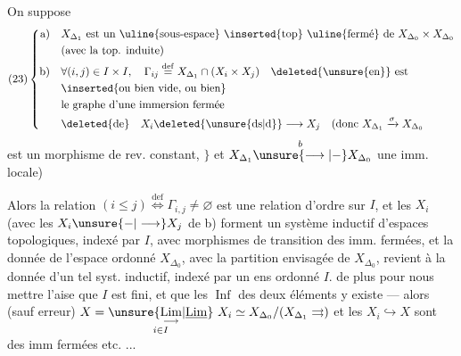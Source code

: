 On suppose
\[
(23)\left\{\begin{aligned}
\text{a)}\quad &X_{\Delta_1}\text{ est un \uline{sous-espace} \inserted{top} \uline{fermé} de }X_{\Delta_0}\times X_{\Delta_0}\\
&\text{(avec la top. induite)}\\
\text{b)}\quad &\forall(i,j)\in I\times I,\quad\Gamma_{ij}\overset{\mathrm{def}}{=}X_{\Delta_1}\cap(X_i\times X_j)\quad\text{\deleted{\unsure{en}} est}\\
&\text{\inserted{ou bien vide, ou bien}}\\
&\text{le graphe d'une immersion fermée}\\
&\deleted{\text{de}}\quad X_i\deleted{\text{\unsure{ds|d}}}\longrightarrow X_j
\quad\text{(donc }X_{\Delta_1}\xrightarrow{\sigma}X_{\Delta_0}
\end{aligned}\right.
\]
est un morphisme de rev.  constant, $\}$
 et
$X_{\Delta_1}\overset{b}{\unsure{\longrightarrow|-}}X_{\Delta_0}$ une imm. locale)

Alors la relation $(i\leq j)\overset{\mathrm{def}}{\Longleftrightarrow}\Gamma_{i,j}\ne\varnothing$ est une
relation d'ordre sur $I$,  et les $X_i$
(avec les $X_i\unsure{-|\longrightarrow}X_j$ de b) forment un
système inductif d'espaces topologiques,
indexé par $I$, avec morphismes de
transition des imm. fermées, et
la donnée de l'espace  ordonné $X_{\Delta_0}$,
 avec la partition envisagée de $X_{\Delta_0}$,
revient à la donnée d'un tel syst.
inductif, indexé par un ens ordonné $I$.
 de plus pour nous mettre
 l'aise que $I$ est fini, et que les
$\operatorname{Inf}$ des deux éléments y existe --- alors
(sauf erreur) $X=\underset{i\in I}{\unsure{\underset{\longrightarrow}{\mathrm{Lim}}|\underline{\mathrm{Lim}}}}\ X_i\simeq
X_{\Delta_0}/(X_{\Delta_1}\rightrightarrows)$
et les $X_i\hookrightarrow X$ sont des imm fermées
etc. ...
